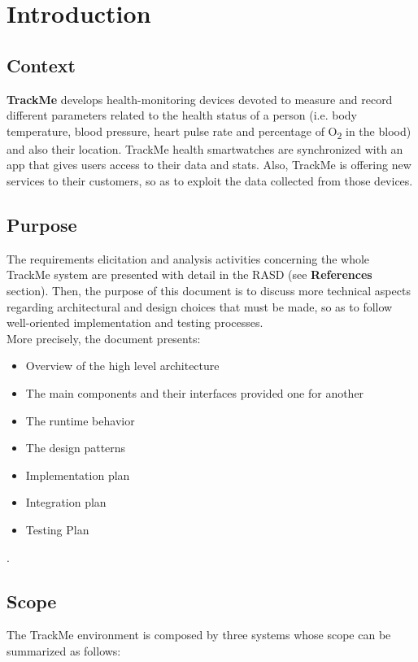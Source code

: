 \documentclass[a4paper, hidelinks, 12pt]{report}
\begin{document}
	\chapter{Introduction}
	\section{Context}
	\textbf{TrackMe} develops health-monitoring devices devoted to measure and record different parameters related to the health status of a person (i.e. body temperature, blood pressure, heart pulse rate and percentage of O\textsubscript{2} in the blood) and also their location. TrackMe health smartwatches are synchronized with an app that gives users access to their data and stats. Also, TrackMe is offering new services to their customers, so as to exploit the data collected from those devices. 
	
	\section{Purpose}
	The requirements elicitation and analysis activities concerning the whole TrackMe system are presented with detail in the RASD (see \textbf{References} section). Then, the purpose of this document is to discuss more technical aspects regarding architectural and design choices that must be made, so as to follow well-oriented implementation and testing processes. \\
		
	More precisely, the document presents:
\begin{itemize}
		\item{}Overview of the high level architecture
		\item{}The main components and their interfaces provided one for another
		\item{}The runtime behavior
		\item{}The design patterns
		\item{} Implementation plan
		\item{}Integration plan
		\item{}Testing Plan
	\end{itemize}.
		
	\section{Scope}
	The TrackMe environment is composed by three systems whose scope can be summarized as follows: \\
	
\end{document}
